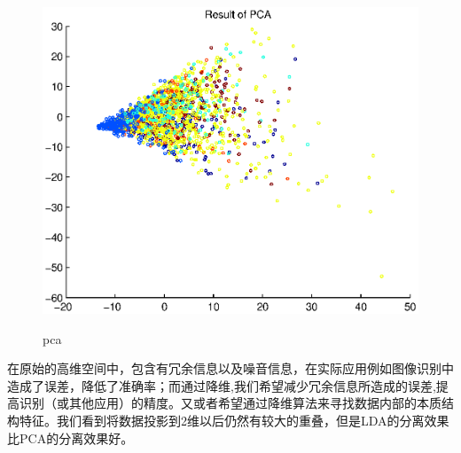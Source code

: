 \documentclass[12pt]{elsarticle}
\begin{document}
\begin{figure}[!ht]
  \centering
  \includegraphics[width=15cm]{pca}\\
  \caption{pca}\label{fig:delay}
\end{figure}

在原始的高维空间中，包含有冗余信息以及噪音信息，在实际应用例如图像识别中造成了误差，降低了准确率；而通过降维,我们希望减少冗余信息所造成的误差,提高识别（或其他应用）的精度。又或者希望通过降维算法来寻找数据内部的本质结构特征。我们看到将数据投影到2维以后仍然有较大的重叠，但是LDA的分离效果比PCA的分离效果好。
\end{document}
